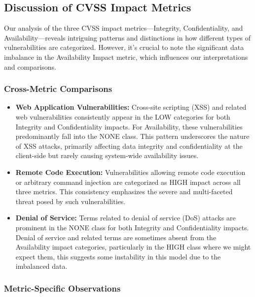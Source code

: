 \documentclass[12pt]{article}
\begin{document}
\subsection{Discussion of CVSS Impact Metrics}

Our analysis of the three CVSS impact metrics---Integrity, Confidentiality, and
Availability---reveals intriguing patterns and distinctions in how different types of
vulnerabilities are categorized. However, it's crucial to note the significant data imbalance in the
Availability Impact metric, which influences our interpretations and comparisons.

\subsubsection{Cross-Metric Comparisons}

\begin{itemize}

	\item \textbf{Web Application Vulnerabilities:} Cross-site scripting (XSS) and related web
	      vulnerabilities consistently appear in the LOW categories for both Integrity and
	      Confidentiality impacts. For Availability, these vulnerabilities predominantly fall into the
	      NONE class. This pattern underscores the nature of XSS attacks, primarily affecting data
	      integrity and confidentiality at the client-side but rarely causing system-wide availability
	      issues.

	\item \textbf{Remote Code Execution:} Vulnerabilities allowing remote code execution or
	      arbitrary command injection are categorized as HIGH impact across all three metrics. This
	      consistency emphasizes the severe and multi-faceted threat posed by such vulnerabilities.

	\item \textbf{Denial of Service:} Terms related to denial of service (DoS) attacks are prominent
	      in the NONE class for both Integrity and Confidentiality impacts. Denial of service and
	      related terms are sometimes absent from the Availability impact categories, particularly in
	      the HIGH class where we might expect them, this suggests some instability in this model
	      due to the imbalanced data.

\end{itemize}

\subsubsection{Metric-Specific Observations}
\end{document}
